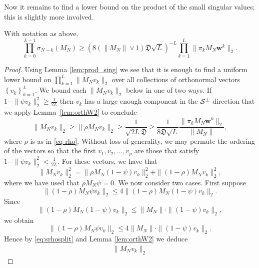 \documentclass{amsart}
\numberwithin{equation}{section}
\def\corAB{}
\def\corOZ{}
\def\corABrev{\textcolor{black}}
\begin{document}
\corAB{Now it remains to find a lower bound on the product of the small singular values;} \corOZ{this is
slightly more involved.}
\begin{proposition}
  \corOZ{With notation as above,}
  \[
    \prod_{k=0}^{\corAB{L}-1} \sigma_{N-k}(M_N)
    \geq
    (\corOZ{8}
    \corAB{(\|M_N\| \vee 1)}\mathfrak{D} \sqrt{\corAB{L}})^{-\corAB{L}}
    \prod_{k=1}^{\corAB{L}} \|\pi_k M_N {\bm w}^k\|_2.
  \]
  \label{prop:lb}
\end{proposition}
\begin{proof}
Using Lemma \ref{lem:prod_sing} we see that it is enough to find a uniform lower bound on
  \(
   \prod_{k=1}^{L}
    \| {M}_{N} v_k\|_2
  \)
  over all collections of orthonormal vectors $\left\{ v_k \right\}_{k=1}^L$. We bound each
  $\| M_N v_k\|_2$ below in one of two ways.
  If $1-\|\psi v_k\|^2_2 \geq \frac{1}{2\corAB{L}}$ then $v_k$ has a large enough component in the \corABrev{$\mathcal{S}^{\perp}$} direction that we apply Lemma~\ref{lem:orthW2} to conclude
  \begin{equation} \label{eq:slb0}
    \| M_N v_k\|_2
    \geq
    \|\rho M_N v_k\|_2
    \geq
    \frac{1}{\sqrt{2\corAB{L}} \mathfrak{D}}
    \corOZ{\geq \frac{1}{8\mathfrak{D}\sqrt{L} }\frac{\|\pi_k M_N {\bm w}^k\|_2}{\|M_N\|}},
  \end{equation}
  \corOZ{where $\rho$ is as in \eqref{eq-rho}.}
  Without loss of generality, we may permute the ordering of the vectors so that the first $v_1,v_2,\dots,v_p$ are those that satisfy $1-\|\psi v_k\|^2_2 < \frac{1}{2\corAB{L}}.$
  For these vectors, we have that
  \begin{equation}
    \|M_N v_k\|^2_2 =
    \| \rho M_N(1-\psi) v_k\|^2_2
    +\| (1-\rho) M_N v_k\|^2_2,
    \label{eq:srhosplit}
  \end{equation}
  where we have used that $\rho M_N \psi = 0.$  %
  \corAB{We now consider two cases. First suppose}
  \[
    \| (1-{\rho}) M_N {\psi} v_k\|_2
    \leq
    \corAB{4} \| (1-{\rho}) M_N (1-{\psi}) v_k\|_2.
  \]
  \corAB{Since
  \[
  \| (1-{\rho}) M_N (1-{\psi}) v_k\|_2 \le \|M_N\| \cdot \|(1-{\psi})v_k\|_2,
  \]
  we obtain
   \[
    \| (1-{\rho}) M_N {\psi} v_k\|_2
        \leq
    4 \|M_N\| \cdot \|(1-{\psi})v_k\|_2.
  \]}
  Hence by \eqref{eq:srhosplit} and Lemma \ref{lem:orthW2} we deduce
  \begin{eqnarray}\label{eq:lb1d1}
    \|M_N v_k\|_2

\end{eqnarray}
\end{proof}
\end{document}
